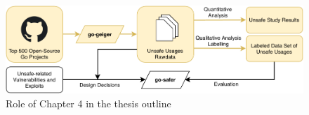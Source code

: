 \begin{figure}[htp!]
    \includegraphics[width=\textwidth]{assets/figures/chapter4/outline4.pdf}
    \caption{Role of Chapter 4 in the thesis outline}
    \label{fig:outline4}
\end{figure}
